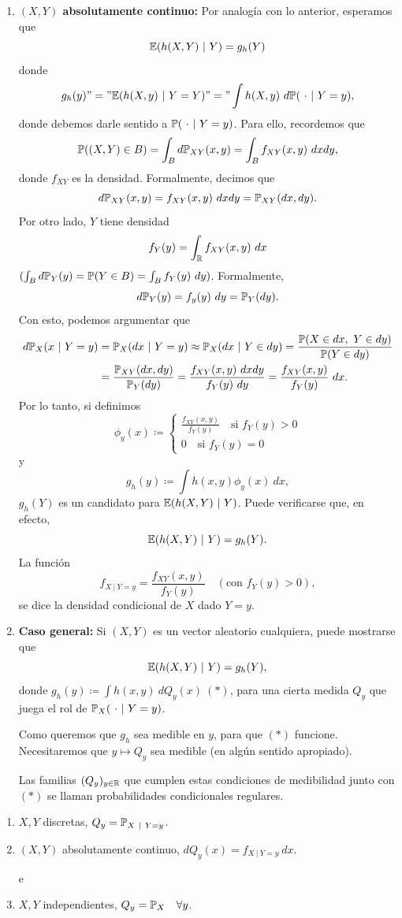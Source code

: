 \begin{enumerate}
	\item \textbf{$(X,Y)$ absolutamente continuo:} Por analogía con lo anterior, esperamos que
	\[ \mathbb{E}(h(X,Y) \ | \ Y) = g_{h}(Y) \]
	donde
	\[ g_{h}(y) "=" \mathbb{E}(h(X,y) \ | \ Y = Y) "=" \int h(X,y) \ d\mathbb{P}( \ \cdot \ | \ Y = y), \]
	donde debemos darle sentido a $\mathbb{P}( \ \cdot \ | \ Y = y)$. Para ello, recordemos que
	\[ \mathbb{P}((X,Y) \in B) = \int_{B} d\mathbb{P}_{XY}(x,y) = \int_{B} f_{XY}(x,y) \ dxdy, \]
	donde $f_{XY}$ es la densidad. Formalmente, decimos que
	\[ d\mathbb{P}_{XY}(x,y) = f_{XY}(x,y) \ dxdy = \mathbb{P}_{XY}(dx,dy). \]
	Por otro lado, $Y$ tiene densidad
	\[ f_{Y}(y) = \int_{\mathbb{R}} f_{XY}(x,y) \ dx \]
	$(\int_{B} d\mathbb{P}_{Y}(y) = \mathbb{P}(Y \in B) = \int_{B} f_{Y}(y) \ dy)$. Formalmente,
	\[ d\mbb{P}_{Y}(y) = f_{y}(y) \ dy = \mbb{P}_{Y}(dy). \]
	Con esto, podemos argumentar que
	\begin{align*}
		d\mbb{P}_{X}(x \ | \ Y = y) &= \mbb{P}_{X}(dx \ | \ Y = y) \approx \mbb{P}_{X}(dx \ | \ Y \in dy) = \frac{\mbb{P}(X \in dx,\ Y \in dy)}{\mbb{P}(Y \in dy)} \\
		&= \frac{\mbb{P}_{XY}(dx,dy)}{\mbb{P}_{Y}(dy)} = \frac{f_{XY}(x,y) \ dxdy}{f_{Y}(y) \ dy} = \frac{f_{XY}(x,y)}{f_{Y}(y)}\ dx
	.\end{align*}
	Por lo tanto, si definimos
	\[ \phi_{y}(x) \coloneq \begin{cases}
		\frac{f_{XY}(x,y)}{f_{Y}(y)} \quad \text{si } f_{Y}(y) > 0 \\
		0 \quad \text{si } f_{Y}(y) = 0
	\end{cases} \]
	y
	\[ g_{h}(y) \coloneq \int h(x,y) \phi_{y}(x) \ dx, \]
	$g_{h}(Y)$ es un candidato para $\mbb{E}(h(X,Y) \ | \ Y)$. Puede verificarse que, en efecto,
	\[ \mathbb{E}(h(X,Y) \ | \ Y) = g_{h}(Y). \]
	La función
	\[ f_{X \ | \ Y = y} = \frac{f_{XY}(x,y)}{f_{Y}(y)} \quad (\text{con } f_{Y}(y) > 0), \]
	se dice la densidad condicional de $X$ dado $Y = y$.

	\item \textbf{Caso general:} Si $(X,Y)$ es un vector aleatorio cualquiera, puede mostrarse que
	\[ \mathbb{E}(h(X,Y) \ | \ Y) = g_{h}(Y), \]
	donde $g_{h}(y) \coloneq \int h(x,y) \ dQ_{y}(x) \ (*)$, para una cierta medida $Q_{y}$ que juega el rol de $\mathbb{P}_{X}( \ \cdot \ | \ Y = y)$. \par
	Como queremos que $g_{h}$ sea medible en $y$, para que $(*)$ funcione. Necesitaremos que $y \mapsto Q_{y}$ sea medible (en algún sentido apropiado). \par
	Las familias $(Q_{y})_{y \in \mathbb{R}}$ que cumplen estas condiciones de medibilidad junto con $(*)$ se llaman probabilidades condicionales regulares.
\end{enumerate}

\begin{eg}
	\begin{enumerate}
		\item $X,Y$ discretas, $Q_{y} = \mathbb{P}_{X \ | \ Y = y}$.

		\item $(X,Y)$ absolutamente continuo, $dQ_{y}(x) = f_{X \ | \ Y = y} \ dx$.

		e\item $X,Y$ independientes, $Q_{y} = \mathbb{P}_{X} \quad \forall y$.
	\end{enumerate}
\end{eg}

